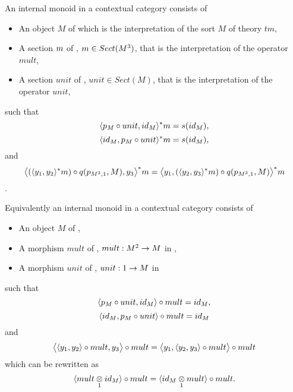 \begin{lemma}
\label{internalmonoidlemma}
An internal monoid in a contextual category \catcw consists of
\begin{itemize}
\item An object $M$ of \catcw which is the interpretation of the sort $M$ of theory $tm$,
\item A section $m$ of \catc, $m \in Sect(M^3)$, that is the interpretation of the operator $mult$,
\item A section $unit$ of \catc, $unit \in Sect(M)$, that is the interpretation of the operator $unit$,
\end{itemize}
such that
\begin{equation}
\label{internalmonoidrepresentation1axiom1}
\tuple{p_M \circ unit,id_M}^*\fmult=s(id_M),
\end{equation}
\begin{equation}
\label{internalmonoidrepresentation1axiom2}
\tuple{id_M,p_M \circ unit}^*\fmult=s(id_M),
\end{equation}
and
\begin{equation}
\label{internalmonoidrepresentation1axiom3}
\bigtuple{(\tuple{y_1,y_2}^*\fmult)\circ q(p_{M^3,1},M),y_3}^*\fmult
=\bigtuple{y_1,(\tuple{y_2,y_3}^*\fmult)\circ q(p_{M^3,1},M)}^*\fmult
\end{equation}.


Equivalently an internal monoid in a contextual category \catcw consists of
\begin{itemize}
\item An object $M$ of \catc,
\item A morphism $mult$ of \catc, $mult: M^2 \rightarrow M$ in \catc,
\item A morphism $unit$ of \catc, $unit: 1 \rightarrow M$ in \catc
\end{itemize}
such that
\begin{equation}
\label{internalmonoidrepresentation2axiom1}
\tuple{p_M \circ unit,id_M}\circ mult=id_M,
\end{equation}
\begin{equation}
\label{internalmonoidrepresentation2axiom2}
\tuple{{id_M,p_M \circ unit}}\circ mult=id_M
\end{equation}
and
\begin{equation}
\label{internalmonoidrepresentation2axiom3}
\bigtuple{\tuple{y_1,y_2}\circ mult,y_3}\circ mult
=\bigtuple{y_1,\tuple{y_2,y_3} \circ mult}\circ mult
\end{equation}
which can be rewritten as 
\begin{equation}
\label{internalmonoidrepresentation2axiom3rewritten}
\tuple{\crossx{mult}{id_M}{1}}\circ mult = \tuple{\crossx{id_M}{mult}{1}}\circ mult.
\end{equation}
\end{lemma}
